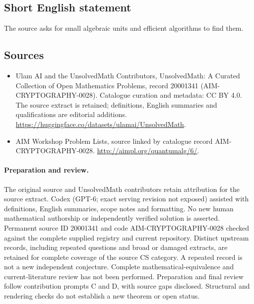 \documentclass[11pt]{article}
\begin{document}
\subsection{Short English statement}
The source asks for small algebraic units and efficient algorithms to find them.
\subsection{Sources}
\begin{itemize}
\item[\hypertarget{source:20001341:1}{S1}] Ulam AI and the UnsolvedMath Contributors, UnsolvedMath: A Curated Collection of Open Mathematics Problems, record 20001341 (AIM-CRYPTOGRAPHY-0028). Catalogue curation and metadata: CC BY 4.0. The source extract is retained; definitions, English summaries and qualifications are editorial additions.
\url{https://huggingface.co/datasets/ulamai/UnsolvedMath}.
\item[\hypertarget{source:20001341:2}{S2}] AIM Workshop Problem Lists, source linked by catalogue record AIM-CRYPTOGRAPHY-0028.
\url{http://aimpl.org/quantumalg/6/}.
\end{itemize}
\paragraph{Preparation and review.}
The original source and UnsolvedMath contributors retain attribution for the source extract. Codex (GPT-6; exact serving revision not exposed) assisted with definitions, English summaries, scope notes and formatting. No new human mathematical authorship or independently verified solution is asserted. Permanent source ID 20001341 and code AIM-CRYPTOGRAPHY-0028 checked against the complete supplied registry and current repository. Distinct upstream records, including repeated questions and broad or damaged extracts, are retained for complete coverage of the source CS category. A repeated record is not a new independent conjecture. Complete mathematical-equivalence and current-literature review has not been performed. Preparation and final review follow contribution prompts C and D, with source gaps disclosed. Structural and rendering checks do not establish a new theorem or open status.
\label{end:20001341}
\end{document}
